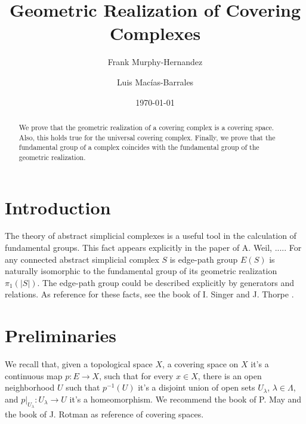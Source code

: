 \documentclass{amsart}
\begin{document}
\title{Geometric Realization of Covering Complexes}

\author{Frank Murphy-Hernandez}
\address{Facultad de Ciencias, UNAM, Mexico City}

\author{Luis Mac\'ias-Barrales}
\address{Instituto de Matem\'aticas, UNAM, Mexico City}
\email{}


\date{\today}


\begin{abstract}
We prove that the geometric realization of a covering complex is a covering space. Also, this holds true for the universal covering complex. Finally, we prove that the fundamental group of a complex coincides with the fundamental group of the geometric realization.
\end{abstract}

\maketitle

\section*{Introduction}

The theory of abstract simplicial complexes is a useful tool in the calculation of fundamental groups. This fact appears explicitly in the paper \cite{weil1960discrete} of A. Weil, .....
For any connected abstract simplicial complex $S$ is edge-path group $E(S)$ is naturally isomorphic to the fundamental group of its geometric realization $\pi_1(\vert S\vert)$. The edge-path group could be described explicitly by  generators and relations. As reference for these facts, see the book of I. Singer and J. Thorpe \cite{singer2015lecture}. 

\section{Preliminaries}


We recall that, given a topological space $X$, a covering space on $X$ it's a continuous map $p\colon E\to X$, such that for every $x\in X$, there is an open neighborhood $U$ such that $p^{-1}(U)$ it's a disjoint union of open sets $U_{\lambda}$, $\lambda\in\Lambda$, and $p|_{U_{\lambda}}\colon U_{\lambda}\to U$ it's a homeomorphism. We recommend the book of P. May \cite{may1999concise} and the book of J. Rotman \cite{rotman2013introduction} as reference of covering spaces.
\end{document}

